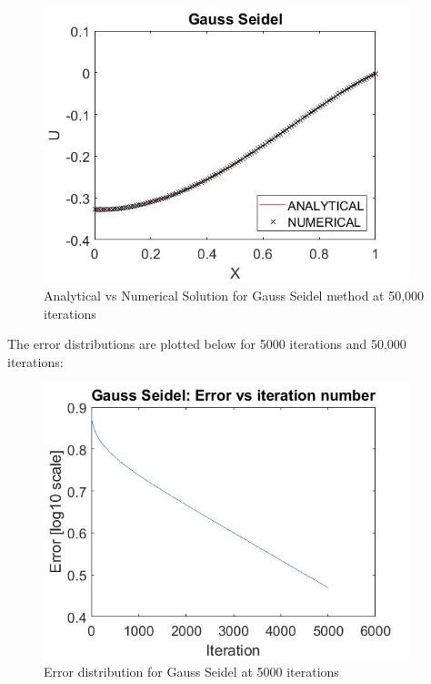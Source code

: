 \documentclass{article}
\begin{document}
	\begin{figure}[H]
	\includegraphics[width=\linewidth,height=80mm]{GS_50k.jpg}
	
	
	\caption{Analytical vs Numerical Solution for Gauss Seidel method at 50,000 iterations}
	\end{figure}


	The error distributions are plotted below for 5000 iterations and 50,000 iterations: 
	
	\begin{figure}[H]
		\includegraphics[width=\linewidth,height=80mm]{GS_error.jpg}	
		
		\caption{Error distribution for Gauss Seidel at 5000 iterations}
	\end{figure}
\end{document}
